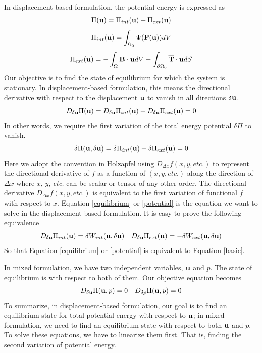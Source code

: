 In displacement-based formulation, the potential energy is expressed as
\begin{equation}
\Pi(\bold{u}) = \Pi_{int}(\bold{u}) + \Pi_{ext}(\bold{u})
\end{equation}
\begin{equation} \label{pint}
\Pi_{int}(\bold{u}) = \int_{\Omega_{0}}\Psi(\bold{F}(\bold{u}))dV
\end{equation}
\begin{equation} \label{pext}
\Pi_{ext}(\bold{u}) =  - \int_\Omega\bold{B}\cdot\bold{u}dV -  \int_{\partial{\Omega_0}}\overline{\bold{T}}\cdot{\bold{u}}dS
\end{equation}
Our objective is to find the state of equilibrium for which the system is stationary. In displacement-based formulation, this means the directional derivative with respect to the displacement $\bold{u}$ to vanish in all directions $\delta{\bold{u}}$.
\begin{equation} \label{equilibrium}
D_{\delta\bold{u}}\Pi(\bold{u}) = D_{\delta\bold{u}}\Pi_{int}(\bold{u}) + D_{\delta\bold{u}}\Pi_{ext}(\bold{u}) = 0
\end{equation} 
 In other words, we require the first variation of the total energy potential $\delta\Pi$ to vanish.
 \begin{equation} \label{potential}
\delta\Pi(\bold{u}, \delta\bold{u}) =\delta\Pi_{int}(\bold{u}) + \delta\Pi_{ext}(\bold{u}) = 0
\end{equation}
Here we adopt the convention in Holzapfel using $D_{\Delta{x}}f(x, y, \textit{etc.})$ to represent the directional derivative of $f$ as a function of $(x, y, \textit{etc.})$ along the direction of $\Delta{x}$ where $x$, $y$, \textit{etc.} can be scalar or tensor of any other order. The directional derivative $D_{\Delta{x}}f(x, y, \textit{etc.})$ is equivalent to the first variation of functional $f$ with respect to $x$.
Equation \ref{equilibrium} or \ref{potential} is the equation we want to solve in the displacement-based formulation. It is easy to prove the following equivalence
\begin{equation}
D_{\delta\bold{u}}\Pi_{int}(\bold{u}) = \delta W_{int}(\bold{u}, \delta\bold{u}) \quad
D_{\delta\bold{u}}\Pi_{ext}(\bold{u}) = - \delta W_{ext}(\bold{u}, \delta\bold{u})
\end{equation}
So that Equation \ref{equilibrium} or \ref{potential} is equivalent to Equation \ref{basic}. 

In mixed formulation, we have two independent variables, $\bold{u}$ and $p$. The state of equilibrium is with respect to both of them. Our objective equation becomes
\begin{equation} \label{target}
D_{\delta\bold{u}}\Pi(\bold{u}, p) = 0 \quad D_{\delta{p}}\Pi(\bold{u}, p) = 0
\end{equation}
To summarize, in displacement-based formulation, our goal is to find an equilibrium state for total potential energy with respect to $\bold{u}$; in mixed formulation, we need to find an equilibrium state with respect to both $\bold{u}$ and $p$. To solve these equations, we have to linearize them first. That is, finding the second variation of potential energy.


